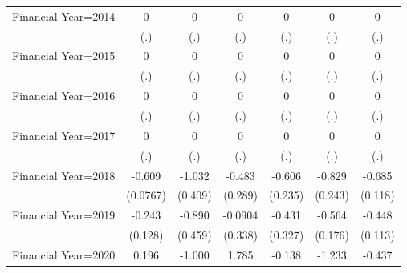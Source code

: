 \begin{table}[htbp]
\begin{tabular}{l*{6}{c}}
\addlinespace
Financial Year=2014 &           0         &           0         &           0         &           0         &           0         &           0         \\
                    &         (.)         &         (.)         &         (.)         &         (.)         &         (.)         &         (.)         \\
\addlinespace
Financial Year=2015 &           0         &           0         &           0         &           0         &           0         &           0         \\
                    &         (.)         &         (.)         &         (.)         &         (.)         &         (.)         &         (.)         \\
\addlinespace
Financial Year=2016 &           0         &           0         &           0         &           0         &           0         &           0         \\
                    &         (.)         &         (.)         &         (.)         &         (.)         &         (.)         &         (.)         \\
\addlinespace
Financial Year=2017 &           0         &           0         &           0         &           0         &           0         &           0         \\
                    &         (.)         &         (.)         &         (.)         &         (.)         &         (.)         &         (.)         \\
\addlinespace
Financial Year=2018 &      -0.609\sym{***}&      -1.032\sym{**} &      -0.483\sym{*}  &      -0.606\sym{***}&      -0.829\sym{***}&      -0.685\sym{***}\\
                    &    (0.0767)         &     (0.409)         &     (0.289)         &     (0.235)         &     (0.243)         &     (0.118)         \\
\addlinespace
Financial Year=2019 &      -0.243\sym{*}  &      -0.890\sym{*}  &     -0.0904         &      -0.431         &      -0.564\sym{***}&      -0.448\sym{***}\\
                    &     (0.128)         &     (0.459)         &     (0.338)         &     (0.327)         &     (0.176)         &     (0.113)         \\
\addlinespace
Financial Year=2020 &       0.196         &      -1.000         &       1.785         &      -0.138         &      -1.233         &      -0.437         \\

\end{tabular}
\end{table}
